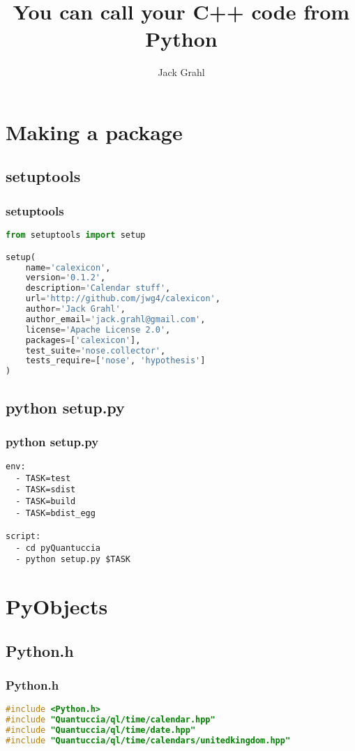 \documentclass{beamer}
\title{You can call your C++ code from Python}
\author{Jack Grahl}
\institute{PrismFP Analytics}
\begin{document}

	\section{Making a package}

	\subsection{setuptools}
	\begin{frame}[fragile]
		\frametitle{setuptools}
		\begin{lstlisting}[language=Python]
from setuptools import setup

setup(
    name='calexicon',
    version='0.1.2',
    description='Calendar stuff',
    url='http://github.com/jwg4/calexicon',
    author='Jack Grahl',
    author_email='jack.grahl@gmail.com',
    license='Apache License 2.0',
    packages=['calexicon'],
    test_suite='nose.collector',
    tests_require=['nose', 'hypothesis']
)
		\end{lstlisting}
	\end{frame}

	\subsection{python setup.py}
	\begin{frame}[fragile]
		\frametitle{python setup.py}
		\begin{lstlisting}
env:
  - TASK=test
  - TASK=sdist
  - TASK=build
  - TASK=bdist_egg

script:
  - cd pyQuantuccia
  - python setup.py $TASK
		\end{lstlisting}
	\end{frame}

	\section{PyObjects}

	\subsection{Python.h}
	\begin{frame}[fragile]
		\frametitle{Python.h}
		\begin{lstlisting}[language=C++]
#include <Python.h>
#include "Quantuccia/ql/time/calendar.hpp"
#include "Quantuccia/ql/time/date.hpp"
#include "Quantuccia/ql/time/calendars/unitedkingdom.hpp"
		\end{lstlisting}
	\end{frame}
\end{document}
